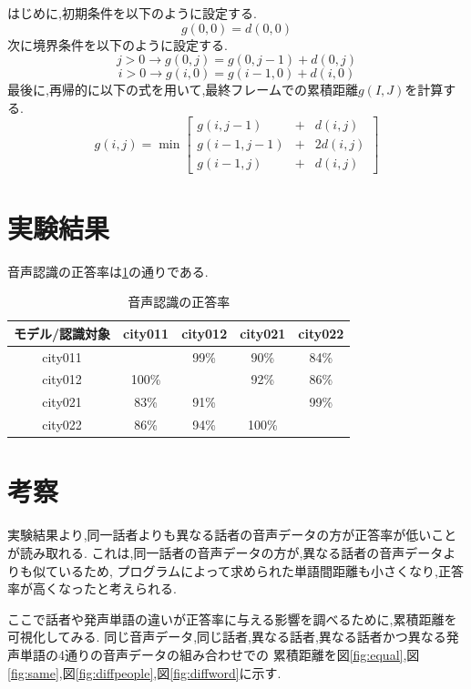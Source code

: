 \documentclass[a4paper,12pt]{article}
\begin{document}
はじめに,初期条件を以下のように設定する.
\[
    g(0,0) = d(0,0)
\]
次に境界条件を以下のように設定する.
\[
    j>0 \rightarrow g(0,j) = g(0,j-1) + d(0,j)
\]
\[
    i>0 \rightarrow g(i,0) = g(i-1,0) + d(i,0)
\]
最後に,再帰的に以下の式を用いて,最終フレームでの累積距離$g(I,J)$を計算する.
\[
g(i, j)=\min \left[\begin{array}{llr}
g(i, j-1) & + & d(i, j) \\
g(i-1, j-1) & + & 2 d(i, j) \\
g(i-1, j) & + & d(i, j)
\end{array}\right]
\]

\section{実験結果}
音声認識の正答率は\ref{tab:correct}の通りである.

\begin{table}[htbp]
    \centering
    \begin{tabular}{|c|c|c|c|c|}
      \hline
      モデル/認識対象 & city011 & city012 & city021 & city022 \\
      \hline
      city011 &       & 99\% & 90\%  & 84\% \\
      \hline
      city012 & 100\% &      & 92\%  & 86\% \\
      \hline
      city021 & 83\%  & 91\% &       & 99\% \\
      \hline
      city022 & 86\% &  94\% & 100\%  &      \\
      \hline
    \end{tabular}
    \caption{音声認識の正答率}
    \label{tab:correct}
\end{table}


\newpage

\section{考察}
実験結果より,同一話者よりも異なる話者の音声データの方が正答率が低いことが読み取れる.
これは,同一話者の音声データの方が,異なる話者の音声データよりも似ているため,
プログラムによって求められた単語間距離も小さくなり,正答率が高くなったと考えられる.

ここで話者や発声単語の違いが正答率に与える影響を調べるために,累積距離を可視化してみる.
同じ音声データ,同じ話者,異なる話者,異なる話者かつ異なる発声単語の4通りの音声データの組み合わせでの
累積距離を図\ref{fig:equal},図\ref{fig:same},図\ref{fig:diffpeople},図\ref{fig:diffword}に示す.
\end{document}

